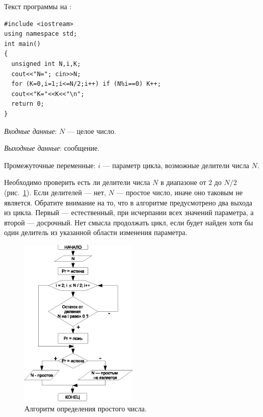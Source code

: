 Текст программы на :
\begin{lstlisting}
#include <iostream>
using namespace std;
int main()
{
  unsigned int N,i,K;
  cout<<"N="; cin>>N;
  for (K=0,i=1;i<=N/2;i++) if (N%i==0) K++;
  cout<<"K="<<K<<"\n";
  return 0;
}
\end{lstlisting}


\emph{Входные данные}: $N$ --- целое число.

\emph{Выходные данные}: сообщение.

Промежуточные переменные: $i$ --- параметр цикла, возможные делители числа $N$.

Необходимо проверить есть ли делители числа $N$ в диапазоне от $2$ до $N/2$ (рис.~\ref{ch03:refDrawing31}). Если
делителей --- нет, $N$ --- простое число, иначе оно таковым не является. Обратите внимание на то, что в
алгоритме предусмотрено два выхода из цикла. Первый --- естественный, при исчерпании всех значений параметра, 
а второй --- досрочный. Нет смысла продолжать цикл, если будет найден хотя бы один  делитель из указанной области изменения
параметра.

\begin{figure}[htb]
\begin{center}
\includegraphics[width=0.5\textwidth]{img/ris_3_32}
\caption{Алгоритм определения простого числа.}
\label{ch03:refDrawing31}
\end{center}
\end{figure}

